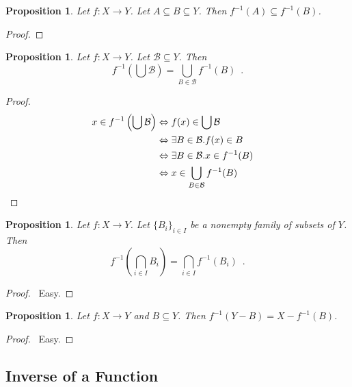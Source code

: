 \documentclass{report}
\let\qed\relax
\newtheorem{prop}[ax]{Proposition}
\theoremstyle{definition}
\begin{document}
\begin{prop}
Let $f : X \rightarrow Y$. Let $A \subseteq B \subseteq Y$. Then $f^{-1}(A) \subseteq f^{-1}(B)$.
\end{prop}

\begin{proof}
\pf
{}
\qed
\end{proof}

\begin{prop}
Let $f : X \rightarrow Y$. Let $\mathcal{B} \subseteq Y$. Then
\[ f^{-1} \left( \bigcup \mathcal{B} \right) = \bigcup_{B \in \mathcal{B}} f^{-1}(B) \enspace . \]
\end{prop}

\begin{proof}
\pf
\begin{align*}
x \in f^{-1} \left( \bigcup \mathcal{B} \right)
& \Leftrightarrow f(x) \in \bigcup \mathcal{B} \\
& \Leftrightarrow \exists B \in \mathcal{B}. f(x) \in B \\
& \Leftrightarrow \exists B \in \mathcal{B}. x \in f^{-1}(B) \\
& \Leftrightarrow x \in \bigcup_{B \in \mathcal{B}} f^{-1}(B) & \qed
\end{align*}
\end{proof}

\begin{prop}
Let $f : X \rightarrow Y$. Let $\{B_i\}_{i \in I}$ be a nonempty family of subsets of $Y$. Then
\[ f^{-1} \left( \bigcap_{i \in I} B_i \right) = \bigcap_{i \in I} f^{-1}(B_i) \enspace . \]
\end{prop}

\begin{proof}
\pf\ Easy. \qed
\end{proof}

\begin{prop}
Let $f : X \rightarrow Y$ and $B \subseteq Y$. Then $f^{-1}(Y - B) = X - f^{-1}(B)$.
\end{prop}

\begin{proof}
\pf\ Easy. \qed
\end{proof}

\subsection{Inverse of a Function}
\end{document}
